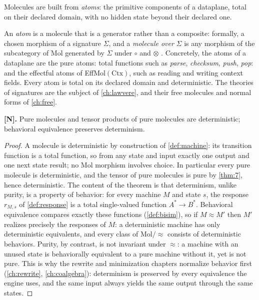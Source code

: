 Molecules are built from \emph{atoms}: the primitive components of a
dataplane, total on their declared domain, with no hidden state beyond their
declared one.

\begin{definition}[Atoms]\label{def:atoms}
An \emph{atom} is a molecule that is a generator rather than a composite:
formally, a chosen morphism of a signature $\Sigma$, and a \emph{molecule
over} $\Sigma$ is any morphism of the subcategory of Mol generated by
$\Sigma$ under $\circ$ and $\otimes$ \citep{lawvere}. Concretely, the atoms
of a dataplane are the pure atoms: total functions such as \emph{parse},
\emph{checksum}, \emph{push}, \emph{pop}: and the effectful atoms of
EffMol$(\mathrm{Ctx})$, such as reading and writing context fields. Every
atom is total on its declared domain and deterministic. The theories of
signatures are the subject of \autoref{ch:lawvere}, and their free molecules
and normal forms of \autoref{ch:free}.
\end{definition}

\begin{theorem}\label{thm:8}
\textbf{[N].} Pure molecules and tensor products of pure molecules are
deterministic; behavioral equivalence preserves determinism.
\end{theorem}

\begin{proof}
A molecule is deterministic by construction of \autoref{def:machine}: its
transition function is a total function, so from any state and input exactly
one output and one next state result; no Mol morphism involves choice. In
particular every pure molecule is deterministic, and the tensor of pure
molecules is pure by \autoref{thm:7}, hence deterministic. The content of the
theorem is that determinism, unlike purity, is a property of behavior: for
every machine $M$ and state $s$, the response $r_{M,s}$ of \autoref{def:response}
is a total single-valued function $A^{*} \to B^{*}$. Behavioral equivalence
compares exactly these functions (\autoref{def:bisim}), so if
$M \approx M'$ then $M'$ realizes precisely the responses of $M$: a
deterministic machine has only deterministic equivalents, and every class of
$\mathrm{Mol}/{\approx}$ consists of deterministic behaviors. Purity, by
contrast, is not invariant under $\approx$: a machine with an unused state is
behaviorally equivalent to a pure machine without it, yet is not pure. This
is why the rewrite and minimization chapters normalize behavior first
(\autoref{ch:rewrite}, \autoref{ch:coalgebra}): determinism is preserved by
every equivalence the engine uses, and the same input always yields the same
output through the same states.
\end{proof}

